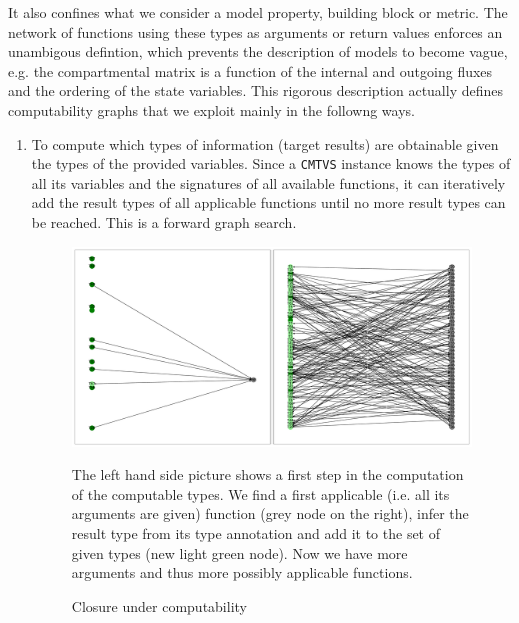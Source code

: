 It also confines what we consider a model property, building block or
metric. The network of functions using these types as arguments or return values
enforces an unambigous defintion, which prevents the description of models to
become vague, e.g. the compartmental matrix is a function of the internal and outgoing fluxes and the ordering of the state variables.  
This rigorous description actually defines computability graphs that we exploit mainly in the followng ways.
\begin{enumerate}
  \item
  \label{enum:computable}
  To compute which types of information (target results) are obtainable given the types of the provided variables. 
  Since a \texttt{CMTVS} instance knows the types of all its variables and the signatures of all
  available functions, it can iteratively add the result types of all applicable functions until no
  more result types can be reached. This is a forward graph search.
    \begin{figure}[h]
      \includegraphics[width=\textwidth]{closure.pdf}
      \caption{Closure under computability} 
      The left hand side picture shows a first step in the computation of the
      computable types.  We find a first applicable (i.e. all its arguments are
      given) function (grey node on the right), infer the result type from its
      type annotation and add it to the set of given types (new light green
      node).  Now we have more arguments and thus more possibly applicable
      functions.


\end{figure}
\end{enumerate}
